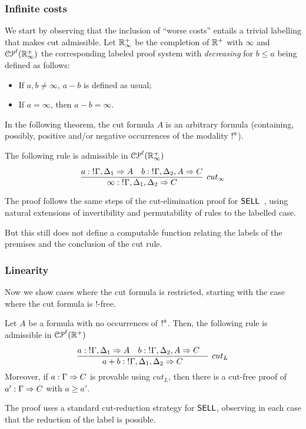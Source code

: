 \subsubsection{Infinite costs}
We start by observing that the inclusion of ``worse costs'' entails a trivial labelling 
that makes cut admissible. Let $\mathbb{R}^+_\infty$ be the completion of $\mathbb{R^+}$ with $\infty$ and $\mathcal{CP}^\ell(\mathbb{R}^{+}_\infty)$ the corresponding labeled proof system with {\em decreasing} for $b\leq a$ being defined as follows:
\begin{itemize}
\item If $a,b\not=\infty$, $a - b$ is defined as usual;
\item If $a=\infty$, then $a - b=\infty$.
 \end{itemize}
In the following theorem,  the cut formula $A$ is an arbitrary formula (containing, possibly, positive and/or negative occurrences of 
the modality $\hbox{$\mathop{!}^{a}$}$). 

\begin{theorem}
The following rule is admissible in $\mathcal{CP}^\ell(\mathbb{R}^{+}_\infty)$
$$
\infer[cut_\infty]{\infty: \nbang{}\Gamma,\Delta_1,\Delta_2 \seq C}{
 \deduce{a: \nbang{}\Gamma,\Delta_1 \seq A}{}&
  \deduce{b:\nbang{}\Gamma,\Delta_2, A \seq C}{}
 }
$$
\end{theorem}
The proof follows the same steps of the cut-elimination proof for $\textsf{SELL}$~\cite{DBLP:conf/kgc/DanosJS93,DBLP:journals/jar/NigamM10}, 
using natural extensions of invertibility and permutability of rules to the labelled case.

But this still does not define a computable function relating the labels of the premises and the conclusion of the cut rule.
\subsubsection{Linearity}

Now we show cases where the cut formula is restricted, starting with the case where the cut formula is $!$-free. 
\begin{theorem}
Let $A$ be a formula with no occurrences of 
$\hbox{$\mathop{!}^{a}$}$. Then, the following rule is admissible in $\mathcal{CP}^\ell(\mathbb{R}^{+})$
$$
\infer[cut_L]{a + b:\nbang{}\Gamma,\Delta_1,\Delta_2\seq  C}
{\deduce{a: \nbang{}\Gamma,\Delta_1 \seq A}{}&
 \deduce{b: \nbang{}\Gamma,\Delta_2, A \seq C}{}&
}
$$
Moreover, if $a: \Gamma \Rightarrow C$ is provable using $cut_L$, then there is a cut-free proof of 
$a': \Gamma \Rightarrow C$ with $a \geq a'$.
\end{theorem}
The proof uses a standard cut-reduction strategy for $\textsf{SELL}$, observing in each case that the reduction of the label is possible. 

